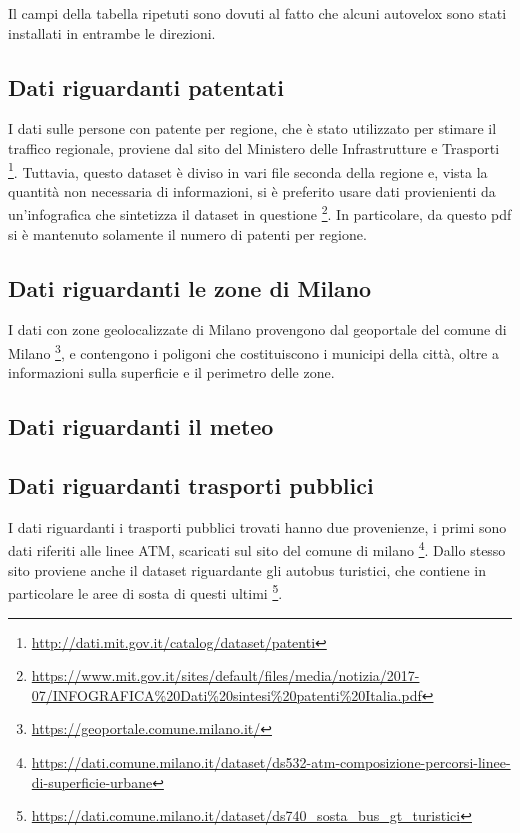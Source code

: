 \documentclass[a4paper]{report}
\begin{document}
Il campi della tabella ripetuti sono dovuti al fatto che alcuni autovelox sono stati installati in entrambe le direzioni.

\subsection{Dati riguardanti patentati}

I dati sulle persone con patente per regione, che è stato utilizzato per stimare il traffico 
regionale, proviene dal sito del Ministero delle Infrastrutture e Trasporti 
\footnote{\url{http://dati.mit.gov.it/catalog/dataset/patenti}}.
Tuttavia, questo dataset è diviso in vari file seconda della regione e, vista la quantità 
non necessaria di informazioni, si è preferito usare dati provienienti da un'infografica che 
sintetizza il dataset in questione
\footnote{\url{https://www.mit.gov.it/sites/default/files/media/notizia/2017-07/INFOGRAFICA\%20Dati\%20sintesi\%20patenti\%20Italia.pdf}}.
In particolare, da questo pdf si è mantenuto solamente il numero di patenti per regione.

\subsection{Dati riguardanti le zone di Milano}

I dati con zone geolocalizzate di Milano provengono dal geoportale del comune di Milano
\footnote{\url{https://geoportale.comune.milano.it/}}, e contengono i poligoni che costituiscono i municipi 
della città, oltre a informazioni sulla superficie e il perimetro delle zone.

\subsection{Dati riguardanti il meteo}

\subsection{Dati riguardanti trasporti pubblici}
I dati riguardanti i trasporti pubblici trovati hanno due provenienze, i primi sono 
dati riferiti alle linee ATM, scaricati sul sito del comune di milano
\footnote{\url{https://dati.comune.milano.it/dataset/ds532-atm-composizione-percorsi-linee-di-superficie-urbane}}.
Dallo stesso sito proviene anche il dataset riguardante gli autobus turistici, che 
contiene in particolare le aree di sosta di questi ultimi
\footnote{\url{https://dati.comune.milano.it/dataset/ds740_sosta_bus_gt_turistici}}.
\end{document}
